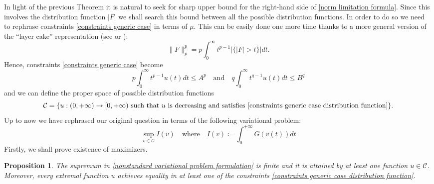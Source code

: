 \documentclass[corpo=11pt, stile=classica, tipotesi=custom,
greek, evenboxes, english]{toptesi}
\numberwithin{equation}{chapter}
\newtheorem{prop}[teo]{Proposition}
\theoremstyle{remark}
\begin{document}
In light of the previous Theorem it is natural to seek for sharp upper bound for the right-hand side of \eqref{norm limitation formula}. Since this involves the distribution function $|F|$ we shall search this bound between all the possible distribution functions. In order to do so we need to rephrase constraints \eqref{constraints generic case} in terms of $\mu$. This can be easily done one more time thanks to a more general version of the ``layer cake'' representation (see \cite[][Theorem 1.13]{liebloss} or \cite[][Proposition 1.1.4]{grafakos}):
\begin{equation*}
	\|F\|_p^p = p \int_0^{\infty} t^{p-1}|\{|F|>t\}|dt.
\end{equation*}
Hence, constraints \eqref{constraints generic case} become
\begin{equation}\label{constraints generic case distribution function}
	p \int_0^{\infty} t^{p-1} u(t)dt \leq A^p \quad \text{and} \quad q \int_0^{\infty} t^{q-1} u(t)dt \leq B^q
\end{equation}
and we can define the proper space of possible distribution functions
\begin{equation}\label{distribution function space}
	\mathcal{C} = \{u : (0,+\infty) \rightarrow [0,+\infty) \text{ such that } u \text{ is decreasing and satisfies } \eqref{constraints generic case distribution function}\}.
\end{equation}
Up to now we have rephrased our original question in terms of the following variational problem:
\begin{equation}\label{nonstandard variational problem formulation}
	\sup_{v \in \mathcal{C}} I(v) \quad \text{where} \quad I(v) \coloneqq \int_0^{+\infty} G(v(t))dt
\end{equation}
Firstly, we shall prove existence of maximizers.
\begin{prop}\label{existence of maximizer}
	The supremum in \eqref{nonstandard variational problem formulation} is finite and it is attained by at least one function $u \in \mathcal{C}$. Moreover, every extremal function $u$ achieves equality in at least one of the constraints \eqref{constraints generic case distribution function}.
\end{prop}
\end{document}
